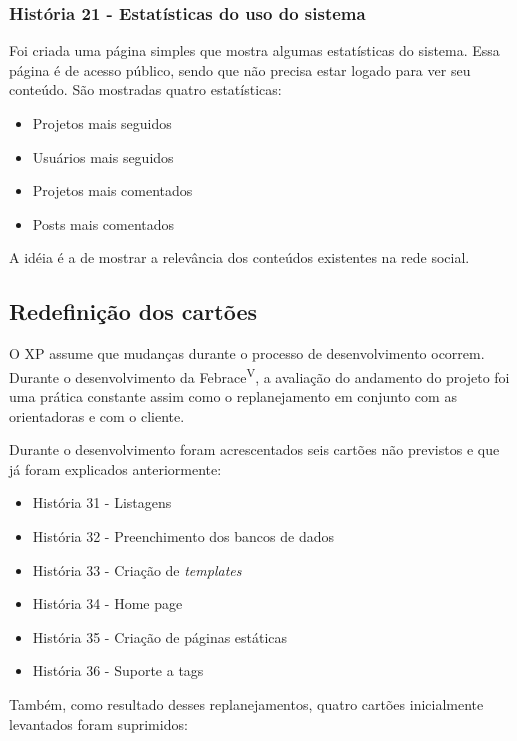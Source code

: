     \subsubsection{História 21 - Estatísticas do uso do sistema}

        Foi criada uma página simples que mostra algumas estatísticas do sistema. Essa página é de acesso público, sendo que não precisa estar logado para ver seu conteúdo. São mostradas quatro estatísticas:
	\begin{itemize}
	  \item{
		Projetos mais seguidos
	  }
	  \item{
		Usuários mais seguidos
	  }
	  \item{ 
	    Projetos mais comentados 
	  }
	  \item{ 
	    Posts mais comentados
	  }
	\end{itemize}

        A idéia é a de mostrar a relevância dos conteúdos existentes na rede social.

  \subsection{Redefinição dos cartões}

    O XP assume que mudanças durante o processo de desenvolvimento ocorrem. Durante o desenvolvimento da Febrace\textsuperscript{V}, a avaliação do andamento do projeto foi uma prática constante assim como o replanejamento em conjunto com as orientadoras e com o cliente. 

    Durante o desenvolvimento foram acrescentados seis cartões não previstos e que já foram explicados anteriormente:

	\begin{itemize}
	  \item{
		História 31 - Listagens
	  }
	  \item{
		História 32 - Preenchimento dos bancos de dados
	  }
	  \item{ 
	    História 33 - Criação de \textit{templates}
	  }
	  \item{ 
	    História 34 - Home page
	  }
	  \item{ 
	    História 35 - Criação de páginas estáticas
	  }
	  \item{ 
	    História 36 - Suporte a tags
	  }
	\end{itemize}

    Também, como resultado desses replanejamentos, quatro cartões inicialmente levantados foram suprimidos:

